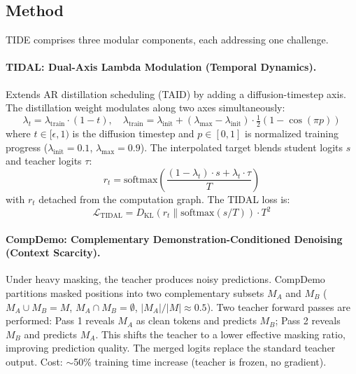 \documentclass[11pt]{article}
\begin{document}
\subsection{Method}

TIDE comprises three modular components, each addressing one challenge.

\paragraph{TIDAL: Dual-Axis Lambda Modulation (Temporal Dynamics).}
Extends AR distillation scheduling (TAID) by adding a diffusion-timestep axis. The distillation weight modulates along two axes simultaneously:
\begin{equation}
    \lambda_t = \lambda_{\mathrm{train}} \cdot (1 - t), \quad \lambda_{\mathrm{train}} = \lambda_{\mathrm{init}} + (\lambda_{\mathrm{max}} - \lambda_{\mathrm{init}}) \cdot \tfrac{1}{2}\!\left(1 - \cos(\pi p)\right)
\end{equation}
where $t \in [\epsilon, 1)$ is the diffusion timestep and $p \in [0, 1]$ is normalized training progress ($\lambda_{\mathrm{init}} = 0.1$, $\lambda_{\mathrm{max}} = 0.9$). The interpolated target blends student logits $s$ and teacher logits $\tau$:
\begin{equation}
    r_t = \mathrm{softmax}\!\left(\frac{(1 - \lambda_t) \cdot s + \lambda_t \cdot \tau}{T}\right)
\end{equation}
with $r_t$ detached from the computation graph. The TIDAL loss is:
\begin{equation}
    \mathcal{L}_{\mathrm{TIDAL}} = D_{\mathrm{KL}}(r_t \| \mathrm{softmax}(s / T)) \cdot T^2
\end{equation}

\paragraph{CompDemo: Complementary Demonstration-Conditioned Denoising (Context Scarcity).}
Under heavy masking, the teacher produces noisy predictions. CompDemo partitions masked positions into two complementary subsets $M_A$ and $M_B$ ($M_A \cup M_B = M$, $M_A \cap M_B = \emptyset$, $|M_A|/|M| \approx 0.5$). Two teacher forward passes are performed: Pass 1 reveals $M_A$ as clean tokens and predicts $M_B$; Pass 2 reveals $M_B$ and predicts $M_A$. This shifts the teacher to a lower effective masking ratio, improving prediction quality. The merged logits replace the standard teacher output. Cost: $\sim$50\% training time increase (teacher is frozen, no gradient).
\end{document}

